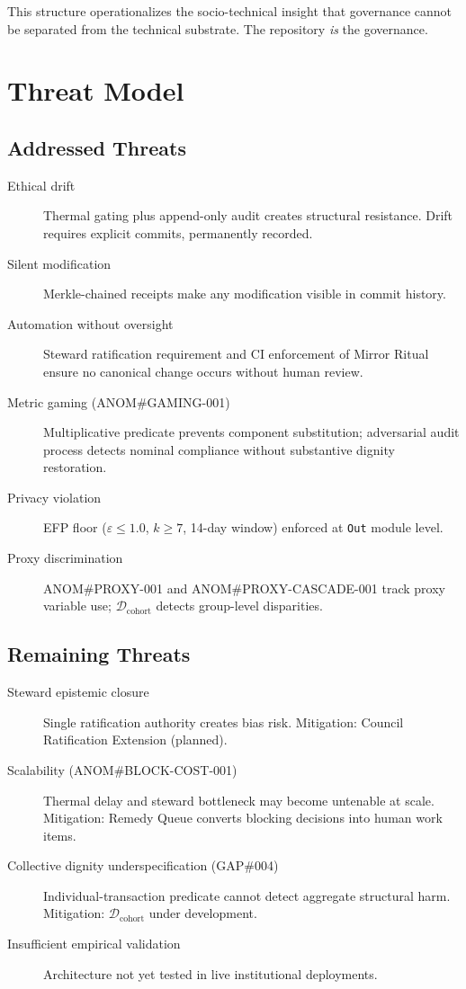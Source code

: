 \documentclass[12pt,a4paper]{article}
\theoremstyle{definition}
\theoremstyle{remark}
\newcommand{\D}{\mathcal{D}}
\begin{document}
This structure operationalizes the socio-technical insight \cite{trist1981} that
governance cannot be separated from the technical substrate. The repository
\emph{is} the governance.

\section{Threat Model}
\label{sec:threats}

\subsection{Addressed Threats}

\begin{description}
\item[Ethical drift] Thermal gating plus append-only audit creates structural
  resistance. Drift requires explicit commits, permanently recorded.
\item[Silent modification] Merkle-chained receipts make any modification visible
  in commit history.
\item[Automation without oversight] Steward ratification requirement and CI
  enforcement of Mirror Ritual ensure no canonical change occurs without human review.
\item[Metric gaming (ANOM\#GAMING-001)] Multiplicative predicate prevents component
  substitution; adversarial audit process detects nominal compliance without
  substantive dignity restoration.
\item[Privacy violation] EFP floor ($\varepsilon \leq 1.0$, $k \geq 7$, 14-day
  window) enforced at \texttt{Out} module level.
\item[Proxy discrimination] ANOM\#PROXY-001 and ANOM\#PROXY-CASCADE-001 track proxy
  variable use; $\D_\text{cohort}$ detects group-level disparities.
\end{description}

\subsection{Remaining Threats}

\begin{description}
\item[Steward epistemic closure] Single ratification authority creates bias risk.
  Mitigation: Council Ratification Extension (planned).
\item[Scalability (ANOM\#BLOCK-COST-001)] Thermal delay and steward bottleneck may
  become untenable at scale. Mitigation: Remedy Queue converts blocking decisions
  into human work items.
\item[Collective dignity underspecification (GAP\#004)] Individual-transaction
  predicate cannot detect aggregate structural harm. Mitigation: $\D_\text{cohort}$
  under development.
\item[Insufficient empirical validation] Architecture not yet tested in live
  institutional deployments.
\end{description}
\end{document}

